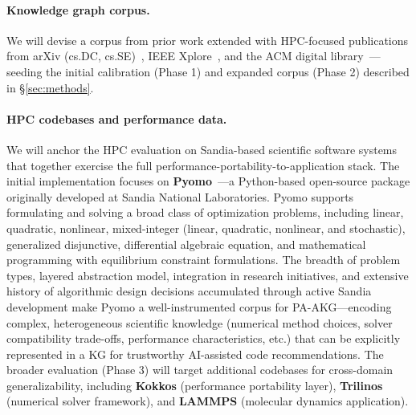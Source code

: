 %


\paragraph{Knowledge graph corpus.} We will devise a corpus from prior work extended with HPC-focused publications from arXiv (cs.DC, cs.SE)~\cite{arxiv}, IEEE Xplore~\cite{ieee}, and the ACM digital library~\cite{acm}---seeding the initial calibration (Phase 1) and expanded corpus (Phase 2) described in \S\ref{sec:methods}.

\paragraph{HPC codebases and performance data.} We will anchor the HPC evaluation on Sandia-based scientific software systems that together exercise the full performance-portability-to-application stack. The initial implementation focuses on \textbf{Pyomo}~\cite{hart2017pyomo}---a Python-based open-source package originally developed at Sandia National Laboratories. Pyomo supports formulating and solving a broad class of optimization problems, including linear, quadratic, nonlinear, mixed-integer (linear, quadratic, nonlinear, and stochastic), generalized disjunctive, differential algebraic equation, and mathematical programming with equilibrium constraint formulations. The breadth of problem types, layered abstraction model, integration in research initiatives, and extensive history of algorithmic design decisions accumulated through active Sandia development make Pyomo a well-instrumented corpus for PA-AKG---encoding complex, heterogeneous scientific knowledge (\eg numerical method choices, solver compatibility trade-offs, performance characteristics, etc.) that can be explicitly represented in a KG for trustworthy AI-assisted code recommendations. The broader evaluation (Phase 3) will target additional codebases for cross-domain generalizability, including \textbf{Kokkos} (performance portability layer), \textbf{Trilinos} (numerical solver framework), and \textbf{LAMMPS} (molecular dynamics application).


